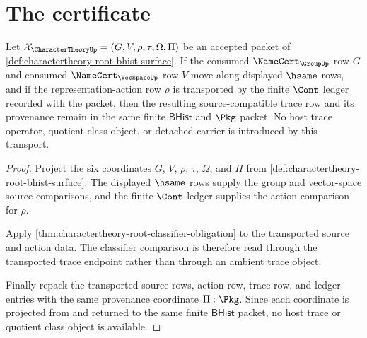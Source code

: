 \section{The certificate}
\label{sec:charactertheory-certificate}

\begin{theorem}
\label{thm:charactertheory-source-compatibility-obligation}
Let $\mathcal X_{\CharacterTheoryUp}=(G,V,\rho,\tau,\Omega,\Pi)$ be an accepted packet of \autoref{def:charactertheory-root-bhist-surface}. If the consumed $\NameCert_{\GroupUp}$ row $G$ and consumed $\NameCert_{\VecSpaceUp}$ row $V$ move along displayed $\hsame$ rows, and if the representation-action row $\rho$ is transported by the finite $\Cont$ ledger recorded with the packet, then the resulting source-compatible trace row and its provenance remain in the same finite $\mathsf{BHist}$ and $\Pkg$ packet. No host trace operator, quotient class object, or detached carrier is introduced by this transport.
\end{theorem}
\begin{proof}
Project the six coordinates $G$, $V$, $\rho$, $\tau$, $\Omega$, and $\Pi$ from \autoref{def:charactertheory-root-bhist-surface}. The displayed $\hsame$ rows supply the group and vector-space source comparisons, and the finite $\Cont$ ledger supplies the action comparison for $\rho$.

Apply \autoref{thm:charactertheory-root-classifier-obligation} to the transported source and action data. The classifier comparison is therefore read through the transported trace endpoint rather than through an ambient trace object.

Finally repack the transported source rows, action row, trace row, and ledger entries with the same provenance coordinate $\Pi:\Pkg$. Since each coordinate is projected from and returned to the same finite $\mathsf{BHist}$ packet, no host trace or quotient class object is available.
\end{proof}

